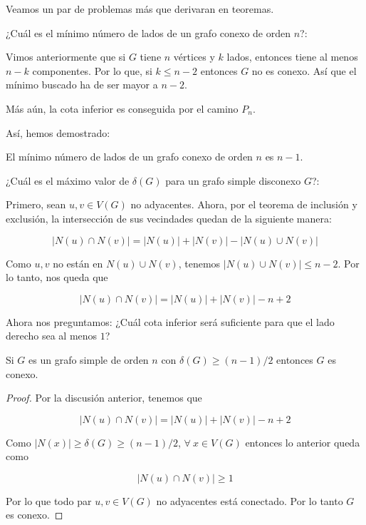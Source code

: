 Veamos un par de problemas más que derivaran en teoremas.

\begin{prob}
    ¿Cuál es el mínimo número de lados de un grafo conexo de orden $n$?:
    
    Vimos anteriormente que si $G$ tiene $n$ vértices y $k$ lados, entonces tiene al menos $n-k$ componentes. Por lo que, si $k \leq n-2$ entonces $G$ no es conexo. Así que el mínimo buscado ha de ser mayor a $n - 2$.
    
    Más aún, la cota inferior es conseguida por el camino $P_n$.
\end{prob}

Así, hemos demostrado:

\begin{teo}
    El mínimo número de lados de un grafo conexo de orden $n$ es $n-1$.
\end{teo}

\begin{prob}
    ¿Cuál es el máximo valor de $\delta(G)$ para un grafo simple disconexo $G$?:
    
    Primero, sean $u, v \in V(G)$ no adyacentes. Ahora, por el teorema de inclusión y exclusión, la intersección de sus vecindades quedan de la siguiente manera:
    
    \[
    \left| N(u) \cap N(v) \right| = \left| N(u) \right| + \left| N(v) \right| - \left| N(u) \cup N(v) \right|
    \]
    
    Como $u, v$ no están en $N(u) \cup N(v)$, tenemos $\left| N(u) \cup N(v) \right| \leq n-2$. Por lo tanto, nos queda que
    
    \[
    \left| N(u) \cap N(v) \right| = \left| N(u) \right| + \left| N(v) \right| - n + 2
    \]
    
    Ahora nos preguntamos: ¿Cuál cota inferior será suficiente para que el lado derecho sea al menos $1$?
\end{prob}

\begin{teo}
    Si $G$ es un grafo simple de orden $n$ con $\delta(G) \geq (n-1)/2$ entonces $G$ es conexo.
\end{teo}

\begin{proof}
    Por la discusión anterior, tenemos que
    
    \[
    \left| N(u) \cap N(v) \right| = \left| N(u) \right| + \left| N(v) \right| - n + 2
    \]
    
    Como $\left| N(x) \right| \geq \delta(G) \geq (n-1)/2$, $\forall~x \in V(G)$ entonces lo anterior queda como
    
    \[
    \left| N(u) \cap N(v) \right| \geq 1
    \]
    
    Por lo que todo par $u, v \in V(G)$ no adyacentes está conectado. Por lo tanto $G$ es conexo.
\end{proof}

